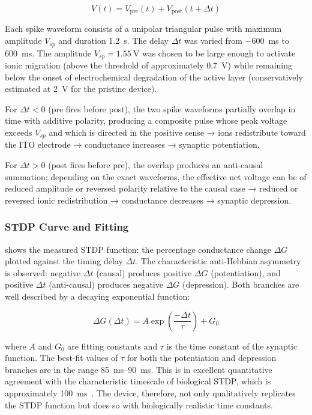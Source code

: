 \documentclass[12pt, a4paper, twoside]{report}
\begin{document}
\begin{equation}
  V(t) = V_{\mathrm{pre}}(t) + V_{\mathrm{post}}(t + \Delta t)
  \label{eq:stdp_voltage}
\end{equation}

Each spike waveform consists of a unipolar triangular pulse with maximum amplitude $V_{sp}$ and duration \SI{1.2}{\second}. The delay $\Delta t$ was varied from \SI{-600}{\milli\second} to \SI{+600}{\milli\second}. The amplitude $V_{sp} = \SI{1.55}{\volt}$ was chosen to be large enough to activate ionic migration (above the threshold of approximately \SI{0.7}{\volt}) while remaining below the onset of electrochemical degradation of the active layer (conservatively estimated at \SI{2}{\volt} for the pristine device).

For $\Delta t < 0$ (pre fires before post), the two spike waveforms partially overlap in time with additive polarity, producing a composite pulse whose peak voltage exceeds $V_{sp}$ and which is directed in the positive sense → ions redistribute toward the ITO electrode → conductance increases → synaptic potentiation.

For $\Delta t > 0$ (post fires before pre), the overlap produces an anti-causal summation; depending on the exact waveforms, the effective net voltage can be of reduced amplitude or reversed polarity relative to the causal case → reduced or reversed ionic redistribution → conductance decreases → synaptic depression.

\subsubsection{STDP Curve and Fitting}

 shows the measured STDP function: the percentage conductance change $\Delta G$ plotted against the timing delay $\Delta t$. The characteristic anti-Hebbian asymmetry is observed: negative $\Delta t$ (causal) produces positive $\Delta G$ (potentiation), and positive $\Delta t$ (anti-causal) produces negative $\Delta G$ (depression). Both branches are well described by a decaying exponential function:

\begin{equation}
  \Delta G(\Delta t) = A \exp\!\left(\frac{-\Delta t}{\tau}\right) + G_0
  \label{eq:stdp_fit}
\end{equation}

where $A$ and $G_0$ are fitting constants and $\tau$ is the time constant of the synaptic function. The best-fit values of $\tau$ for both the potentiation and depression branches are in the range \SIrange{85}{90}{\milli\second}. This is in excellent quantitative agreement with the characteristic timescale of biological STDP, which is approximately \SI{100}{\milli\second}~\cite{Kuzum2013, Bi1998}. The device, therefore, not only qualitatively replicates the STDP function but does so with biologically realistic time constants.
\end{document}
